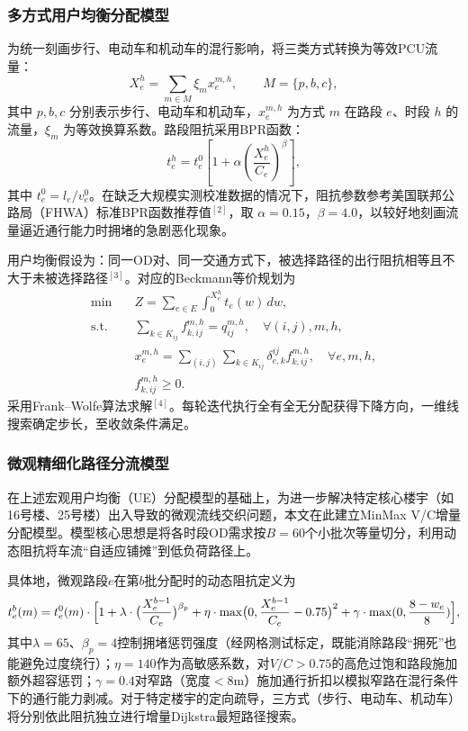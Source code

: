 \documentclass[UTF8,zihao=-4,a4paper]{ctexart}
\numberwithin{table}{section}
\numberwithin{figure}{section}
\numberwithin{equation}{section}
\begin{document}
\subsubsection{多方式用户均衡分配模型}

为统一刻画步行、电动车和机动车的混行影响，将三类方式转换为等效PCU流量：
\begin{equation}
X_e^h=\sum_{m\in M}\xi_m x_e^{m,h},\qquad M=\{p,b,c\},
\end{equation}
其中 $p,b,c$ 分别表示步行、电动车和机动车，$x_e^{m,h}$ 为方式 $m$ 在路段 $e$、时段 $h$ 的流量，$\xi_m$ 为等效换算系数。路段阻抗采用BPR函数：
\begin{equation}
t_e^h=t_e^0\left[1+\alpha\left(\frac{X_e^h}{C_e}\right)^\beta\right],
\end{equation}
其中 $t_e^0=l_e/v_e^0$。在缺乏大规模实测校准数据的情况下，阻抗参数参考美国联邦公路局（FHWA）标准BPR函数推荐值$^{[2]}$，取 $\alpha=0.15$，$\beta=4.0$，以较好地刻画流量逼近通行能力时拥堵的急剧恶化现象。

用户均衡假设为：同一OD对、同一交通方式下，被选择路径的出行阻抗相等且不大于未被选择路径$^{[3]}$。对应的Beckmann等价规划为
\begin{equation}
\begin{aligned}
\min \quad & Z=\sum_{e\in E}\int_0^{X_e^h}t_e(w)\,dw,\\
\text{s.t.}\quad & \sum_{k\in K_{ij}} f_{k,ij}^{m,h}=q_{ij}^{m,h},\quad \forall(i,j),m,h,\\
& x_e^{m,h}=\sum_{(i,j)}\sum_{k\in K_{ij}}\delta_{e,k}^{ij}f_{k,ij}^{m,h},\quad \forall e,m,h,\\
& f_{k,ij}^{m,h}\ge 0.
\end{aligned}
\end{equation}
采用Frank--Wolfe算法求解$^{[4]}$。每轮迭代执行全有全无分配获得下降方向，一维线搜索确定步长，至收敛条件满足。

\subsubsection{微观精细化路径分流模型}

在上述宏观用户均衡（UE）分配模型的基础上，为进一步解决特定核心楼宇（如16号楼、25号楼）出入导致的微观流线交织问题，本文在此建立MinMax V/C增量分配模型。模型核心思想是将各时段OD需求按$B=60$个小批次等量切分，利用动态阻抗将车流“自适应铺摊”到低负荷路径上。

具体地，微观路段$e$在第$b$批分配时的动态阻抗定义为
\begin{equation}
t_e^b(m)=t_e^{0}(m)\cdot\Bigl[1+\lambda\cdot\bigl(\frac{X_e^{b-1}}{C_e}\bigr)^{\beta_p}+\eta\cdot\max\bigl(0,\frac{X_e^{b-1}}{C_e}-0.75\bigr)^2+\gamma\cdot\max(0,\frac{8-w_e}{8})\Bigr],
\end{equation}
其中$\lambda=65$、$\beta_p=4$控制拥堵惩罚强度（经网格测试标定，既能消除路段“拥死”也能避免过度绕行）；$\eta=140$作为高敏感系数，对$V/C>0.75$的高危过饱和路段施加额外超容惩罚；$\gamma=0.4$对窄路（宽度$<8$m）施加通行折扣以模拟窄路在混行条件下的通行能力剥减。对于特定楼宇的定向疏导，三方式（步行、电动车、机动车）将分别依此阻抗独立进行增量Dijkstra最短路径搜索。
\end{document}
